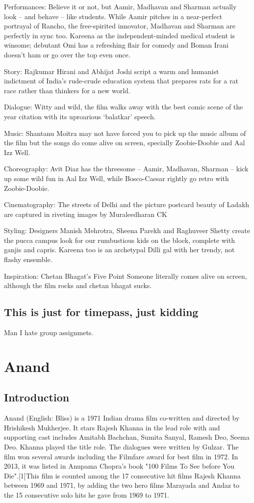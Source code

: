 \documentclass[11pt]{article}
\begin{document}
Performances: Believe it or not, but Aamir, Madhavan and Sharman actually look -- and behave -- like students. While Aamir pitches in a near-perfect portrayal of Rancho, the free-spirited innovator, Madhavan and Sharman are perfectly in sync too. Kareena as the independent-minded medical student is winsome; debutant Omi has a refreshing flair for comedy and Boman Irani doesn't ham or go over the top even once.

Story: Rajkumar Hirani and Abhijat Joshi script a warm and humanist indictment of India's rude-crude education system that prepares rats for a rat race rather than thinkers for a new world.

Dialogue: Witty and wild, the film walks away with the best comic scene of the year citation with its uproarious `balatkar' speech.

Music: Shantanu Moitra may not have forced you to pick up the music album of the film but the songs do come alive on screen, specially Zoobie-Doobie and Aal Izz Well.

Choreography: Avit Diaz has the threesome -- Aamir, Madhavan, Sharman -- kick up some wild fun in Aal Izz Well, while Bosco-Caesar rightly go retro with Zoobie-Doobie.

Cinematography: The streets of Delhi and the picture postcard beauty of Ladakh are captured in riveting images by Muraleedharan CK

Styling: Designers Manish Mehrotra, Sheena Parekh and Raghuveer Shetty create the pucca campus look for our rumbustious kids on the block, complete with ganjis and capris. Kareena too is an archetypal Dilli gal with her trendy, not flashy ensemble.

Inspiration: Chetan Bhagat's Five Point Someone literally comes alive on screen, although the film rocks and chetan bhagat sucks.
\subsection{This is just for timepass, just kidding}
Man I hate group assignmets.
\section*{Anand}
\subsection*{Introduction}
Anand (English: Bliss) is a 1971 Indian drama film co-written and directed by Hrishikesh Mukherjee.
It stars Rajesh Khanna in the lead role with and supporting cast includes Amitabh Bachchan, Sumita Sanyal, 
Ramesh Deo, Seema Deo. Khanna played the title role. The dialogues were written by Gulzar. The film won 
several awards including the Filmfare award for best film in 1972. In 2013, it was listed in Anupama Chopra's
book "100 Films To See before You Die".[1]This film is counted among the 17 consecutive hit films Rajesh Khanna
between 1969 and 1971, by adding the two hero films Marayada and Andaz to the 15 consecutive solo hits he gave 
from 1969 to 1971.
\end{document}
